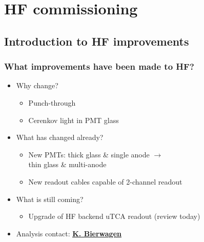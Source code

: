\documentclass[bigger]{beamer}
\providecommand{\alert}[1]{\textbf{#1}}
\begin{document}
\section{HF commissioning}
\label{sec-3}
\subsection{Introduction to HF improvements}
\label{sec-3-1}
\begin{frame}
\frametitle{What improvements have been made to HF?}
\label{sec-3-1-1}
\begin{itemize}

\item Why change?
\label{sec-3-1-1-1}%
\begin{itemize}

\item Punch-through
\label{sec-3-1-1-1-1}%

\item Cerenkov light in PMT glass
\label{sec-3-1-1-1-2}%
\end{itemize} %

\item What has changed already?
\label{sec-3-1-1-2}%
\begin{itemize}

\item New PMTs: thick glass \& single anode $\to$ \\ thin glass \& multi-anode
\label{sec-3-1-1-2-1}%

\item New readout cables capable of 2-channel readout
\label{sec-3-1-1-2-2}%
\end{itemize} %

\item What is still coming?
\label{sec-3-1-1-3}%
\begin{itemize}

\item Upgrade of HF backend uTCA readout (review today)
\label{sec-3-1-1-3-1}%
\end{itemize} %

\item Analysis contact: \href{mailto:katharina.bierwagen@cern.ch}{\underline{\alert{K. Bierwagen}}}
\label{sec-3-1-1-4}%
\end{itemize} %
\end{frame}
\end{document}
